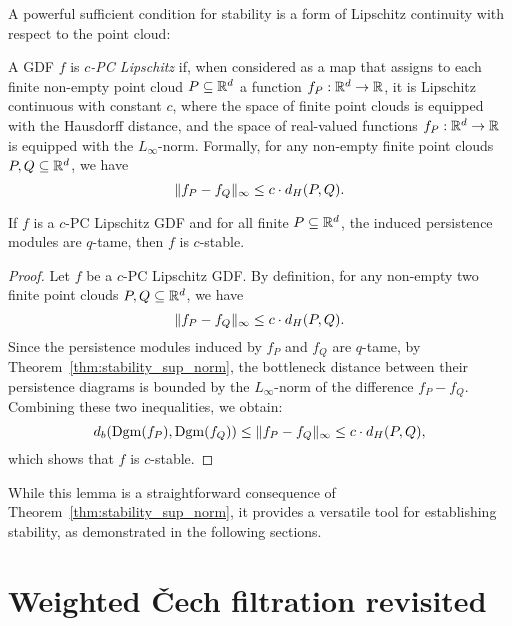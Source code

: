 A powerful sufficient condition for stability is a form of Lipschitz continuity
with respect to the point cloud:
\begin{definition}
    A GDF $f$ is \emph{$c$-PC Lipschitz} if, when considered as a map that
    assigns to each finite non-empty point cloud $P \subseteq \mathbb{R}^d$ a function
    $f_P : \mathbb{R}^d \to \mathbb{R}$, it is Lipschitz continuous with constant $c$, where the
    space of finite point clouds is equipped with the Hausdorff distance, and
    the space of real-valued functions $f_P : \mathbb{R}^d \to \mathbb{R}$ is equipped with the
    $L_\infty$-norm. Formally, for any non-empty finite point clouds $P, Q
    \subseteq \mathbb{R}^d$, we have
    \begin{equation}
        \lVert f_P - f_Q\rVert_\infty \leq c \cdot d_H(P, Q).
    \end{equation}
\end{definition}
\begin{lemma}
    \label{lem:pc_lipschitz_stable}
    If $f$ is a $c$-PC Lipschitz GDF and for all finite $P \subseteq \mathbb{R}^d$,
    the induced persistence modules are $q$-tame, then $f$ is $c$-stable.
\end{lemma}
\begin{proof}
    Let $f$ be a $c$-PC Lipschitz GDF. By definition, for any non-empty two
    finite point clouds $P, Q \subseteq \mathbb{R}^d$, we have
    \begin{equation}
        \lVert f_P - f_Q\rVert_\infty \leq c \cdot d_H(P, Q).
    \end{equation}
    Since the persistence modules induced by $f_P$ and $f_Q$ are $q$-tame, by
    Theorem~\ref{thm:stability_sup_norm}, the bottleneck distance between their
    persistence diagrams is bounded by the $L_\infty$-norm of the difference
    $f_P - f_Q$. Combining these two inequalities, we obtain:
    \begin{equation}
        d_b(\operatorname{Dgm}(f_P), \operatorname{Dgm}(f_Q)) \leq \lVert f_P - f_Q\rVert_\infty \leq c \cdot d_H(P, Q),
    \end{equation}
    which shows that $f$ is $c$-stable.
\end{proof}
While this lemma is a straightforward consequence of
Theorem~\ref{thm:stability_sup_norm}, it provides a versatile tool for
establishing stability, as demonstrated in the following sections.

\section{Weighted \v{C}ech filtration revisited}

